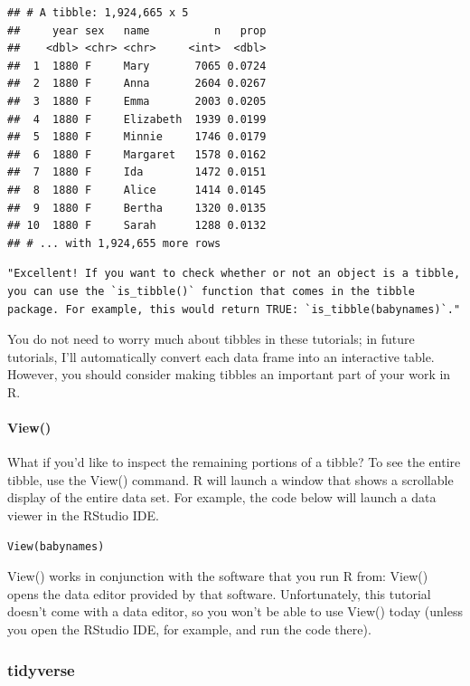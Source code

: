 \documentclass[
]{article}
\begin{document}
\begin{verbatim}
## # A tibble: 1,924,665 x 5
##     year sex   name          n   prop
##    <dbl> <chr> <chr>     <int>  <dbl>
##  1  1880 F     Mary       7065 0.0724
##  2  1880 F     Anna       2604 0.0267
##  3  1880 F     Emma       2003 0.0205
##  4  1880 F     Elizabeth  1939 0.0199
##  5  1880 F     Minnie     1746 0.0179
##  6  1880 F     Margaret   1578 0.0162
##  7  1880 F     Ida        1472 0.0151
##  8  1880 F     Alice      1414 0.0145
##  9  1880 F     Bertha     1320 0.0135
## 10  1880 F     Sarah      1288 0.0132
## # ... with 1,924,655 more rows
\end{verbatim}

\begin{verbatim}
"Excellent! If you want to check whether or not an object is a tibble, you can use the `is_tibble()` function that comes in the tibble package. For example, this would return TRUE: `is_tibble(babynames)`."
\end{verbatim}

You do not need to worry much about tibbles in these tutorials; in
future tutorials, I'll automatically convert each data frame into an
interactive table. However, you should consider making tibbles an
important part of your work in R.

\hypertarget{view}{%
\paragraph{View()}\label{view}}

What if you'd like to inspect the remaining portions of a tibble? To see
the entire tibble, use the View() command. R will launch a window that
shows a scrollable display of the entire data set. For example, the code
below will launch a data viewer in the RStudio IDE.

\begin{verbatim}
View(babynames)
\end{verbatim}

View() works in conjunction with the software that you run R from:
View() opens the data editor provided by that software. Unfortunately,
this tutorial doesn't come with a data editor, so you won't be able to
use View() today (unless you open the RStudio IDE, for example, and run
the code there).

\hypertarget{tidyverse}{%
\subsubsection{tidyverse}\label{tidyverse}}
\end{document}
